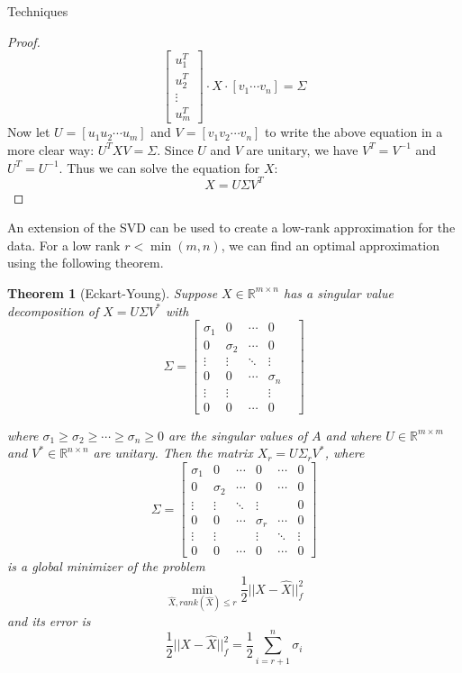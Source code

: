 \documentclass[12pt]{pom_thesis}
\newtheorem{theorem}{Theorem}
\begin{document}
\begin{chapter}{Techniques}
\begin{proof}
	 	 $$\begin{bmatrix}
	 	 u_1^T \\
	 	 u_2^T        \\
	 	 \vdots      \\
	 	 u_m^T 
	 	 \end{bmatrix} \cdot X \cdot [v_1 \cdots v_n] =  \Sigma$$
	 	 Now let $U= [u_1 u_2 \cdots u_m]$ and $V=[v_1 v_2 \cdots v_n]$ to write the above equation in a more clear way: $U^TXV=\Sigma$. Since $U$ and $V$ are unitary, we have $V^T=V^{-1}$ and $U^T=U^{-1}$. Thus we can solve the equation for $X$:
	 	 $$X = U \Sigma V^T$$
\end{proof}
An extension of the SVD can be used to create a low-rank approximation for the data. For a low rank $r < \min(m,n)$, we can find an optimal approximation using the following theorem.
\begin{theorem}[Eckart-Young]
	Suppose  $X \in \mathbb{R}^{m \times n}$ has a singular value decomposition of $X= U \Sigma V^*$ with $$\Sigma = \begin{bmatrix}
	\sigma_1  & 0     & \cdots             & 0    \\
	0  & \sigma_2 & \cdots & 0        \\
	\vdots  & \vdots & \ddots & \vdots &     \\
	0 & 0 & \cdots & \sigma_n   \\
	\vdots  &     \vdots    && \vdots \\
	0 & 0      &      \cdots  &0      
	\end{bmatrix}$$

	where $\sigma_1 \geq \sigma_2 \geq \cdots \geq \sigma_n \geq 0$ are the singular values of $A$ and where  $U \in \mathbb{R}^{m \times m}$  and $V^* \in \mathbb{R}^{n \times n}$ are unitary. Then the matrix $X_r = U\Sigma_rV^*$, where 
	$$\Sigma = \begin{bmatrix}
	\sigma_1  & 0     & \cdots      &0       &   \cdots & 0   \\
	0  & \sigma_2 & \cdots & 0    &  \cdots & 0    \\
	\vdots  & \vdots & \ddots & \vdots &  & 0   \\
	0 & 0 & \cdots & \sigma_r  & \cdots & 0  \\
	\vdots  &     \vdots    && \vdots & \ddots & \vdots  \\
	0 & 0      &      \cdots  &0      & \cdots & 0 
	\end{bmatrix}$$
	is a global minimizer of the problem 
	$$\min_{\hat{X}, rank(\hat{X}) \leq r} \frac{1}{2} ||X-\hat{X}||^2_f$$
	and its error is 	$$\frac{1}{2} ||X-\hat{X}||^2_f = \frac{1}{2}\sum_{i=r+1}^n \sigma_i$$


\end{theorem}
\end{chapter}
\end{document}
